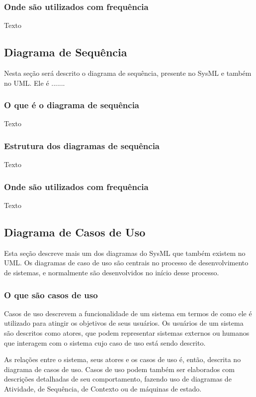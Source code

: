 \subsubsection{Onde são utilizados com frequência}
Texto

\subsection{Diagrama de Sequência}
Nesta seção será descrito o diagrama de sequência, presente no SysML e também no UML. Ele é .......

\subsubsection{O que é o diagrama de sequência}
Texto

\subsubsection{Estrutura dos diagramas de sequência}
Texto

\subsubsection{Onde são utilizados com frequência}
Texto

\subsection{Diagrama de Casos de Uso}
Esta seção descreve mais um dos diagramas do SysML que também existem no UML. Os diagramas de caso de uso são centrais no processo de desenvolvimento de sistemas, e normalmente são desenvolvidos no início desse processo.

\subsubsection{O que são casos de uso}

Casos de uso descrevem a funcionalidade de um sistema em termos de como ele é utilizado para atingir os objetivos de seus usuários. Os usuários de um sistema são descritos como atores, que podem representar sistemas externos ou humanos que interagem com o sistema cujo caso de uso está sendo descrito.

As relações entre o sistema, seus atores e os casos de uso é, então, descrita no diagrama de casos de uso.
Casos de uso podem também ser elaborados com descrições detalhadas de seu comportamento, fazendo uso de diagramas de Atividade, de Sequência, de Contexto ou de máquinas de estado.

